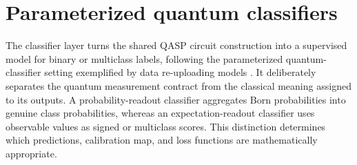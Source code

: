 \documentclass[10pt]{article}
\begin{document}
\section{Parameterized quantum classifiers}
\label{sec:classifiers}

The classifier layer turns the shared QASP circuit construction into a
supervised model for binary or multiclass labels, following the parameterized
quantum-classifier setting exemplified by data re-uploading models
\cite{perezsalinas2020data}.  It deliberately separates
the quantum measurement contract from the classical meaning assigned to its
outputs.  A probability-readout classifier aggregates Born probabilities into
genuine class probabilities, whereas an expectation-readout classifier uses
observable values as signed or multiclass scores.  This distinction determines
which predictions, calibration map, and loss functions are mathematically
appropriate.
\end{document}
